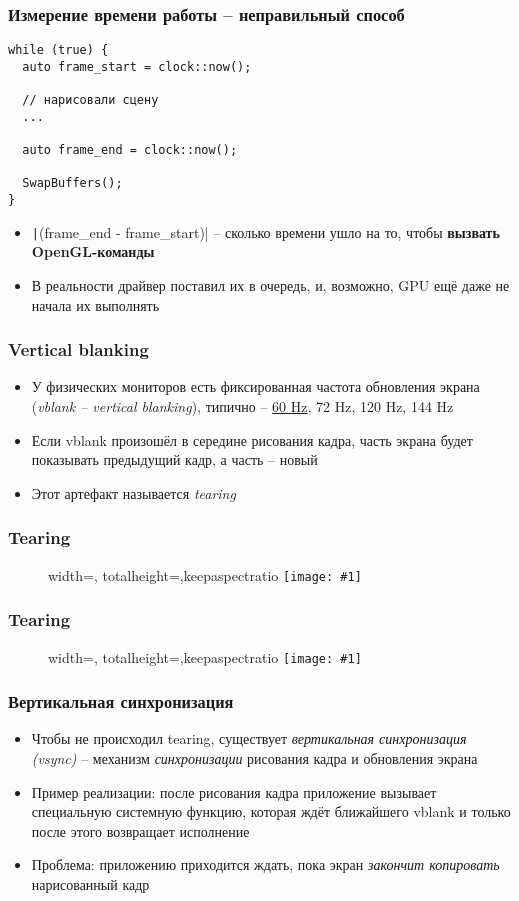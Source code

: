 \documentclass{beamer}
\newcommand{\slideimage}[1]{
  \begin{figure}
    \begin{adjustbox}{width=\textwidth, totalheight=\textheight-2\baselineskip-2\baselineskip,keepaspectratio}
      \texttt{[image: \#1]}
    \end{adjustbox}
  \end{figure}
}
\begin{document}
\begin{frame}[fragile]
\frametitle{Измерение времени работы -- неправильный способ}
\begin{verbatim}
while (true) {
  auto frame_start = clock::now();

  // нарисовали сцену
  ...

  auto frame_end = clock::now();

  SwapBuffers();
}
\end{verbatim}
\vspace*{-1cm}
\pause
\begin{itemize}
\item \texttt|(frame_end - frame_start)| -- сколько времени ушло на то, чтобы \textbf{вызвать OpenGL-команды}
\pause
\item В реальности драйвер поставил их в очередь, и, возможно, GPU ещё даже не начала их выполнять
\end{itemize}
\end{frame}

\begin{frame}[fragile]
\frametitle{Vertical blanking}
\begin{itemize}
\item У физических мониторов есть фиксированная частота обновления экрана (\textit{vblank -- vertical blanking}), типично -- \underline{60 Hz}, 72 Hz, 120 Hz, 144 Hz
\pause
\item Если vblank произошёл в середине рисования кадра, часть экрана будет показывать предыдущий кадр, а часть -- новый
\pause
\item Этот артефакт называется \textit{tearing}
\end{itemize}
\end{frame}

\begin{frame}[fragile]
\frametitle{Tearing}
\slideimage{tearing.png}
\end{frame}

\begin{frame}[fragile]
\frametitle{Tearing}
\slideimage{tearing_border.png}
\end{frame}

\begin{frame}[fragile]
\frametitle{Вертикальная синхронизация}
\begin{itemize}
\item Чтобы не происходил tearing, существует \textit{вертикальная синхронизация (vsync)} -- механизм \textit{синхронизации} рисования кадра и обновления экрана
\pause
\item Пример реализации: после рисования кадра приложение вызывает специальную системную функцию, которая ждёт ближайшего vblank и только после этого возвращает исполнение
\pause
\item Проблема: приложению приходится ждать, пока экран \textit{закончит копировать} нарисованный кадр
\end{itemize}
\end{frame}
\end{document}

